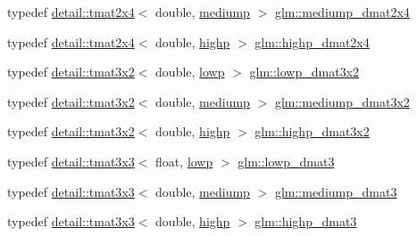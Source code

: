 \begin{DoxyCompactItemize}
typedef \hyperlink{structglm_1_1detail_1_1tmat2x4}{detail\+::tmat2x4}$<$ double, \hyperlink{namespaceglm_a0f04f086094c747d227af4425893f545a6416f3ea0c9025fb21ed50c4d6620482}{mediump} $>$ \hyperlink{group__core__precision_gadb60bf60ef2b8da4a28a372b2bcca3a3}{glm\+::mediump\+\_\+dmat2x4}
\item 
typedef \hyperlink{structglm_1_1detail_1_1tmat2x4}{detail\+::tmat2x4}$<$ double, \hyperlink{namespaceglm_a0f04f086094c747d227af4425893f545ac6f7eab42eacbb10d59a58e95e362074}{highp} $>$ \hyperlink{group__core__precision_gacd51d8188f7d66a83c035b8c4cd69f2d}{glm\+::highp\+\_\+dmat2x4}
\item 
typedef \hyperlink{structglm_1_1detail_1_1tmat3x2}{detail\+::tmat3x2}$<$ double, \hyperlink{namespaceglm_a0f04f086094c747d227af4425893f545ae161af3fc695e696ce3bf69f7332bc2d}{lowp} $>$ \hyperlink{group__core__precision_ga678c21e4fadeda255cfb146d40844bdd}{glm\+::lowp\+\_\+dmat3x2}
\item 
typedef \hyperlink{structglm_1_1detail_1_1tmat3x2}{detail\+::tmat3x2}$<$ double, \hyperlink{namespaceglm_a0f04f086094c747d227af4425893f545a6416f3ea0c9025fb21ed50c4d6620482}{mediump} $>$ \hyperlink{group__core__precision_gaff0060984716bcda68ff69ed27536bf6}{glm\+::mediump\+\_\+dmat3x2}
\item 
typedef \hyperlink{structglm_1_1detail_1_1tmat3x2}{detail\+::tmat3x2}$<$ double, \hyperlink{namespaceglm_a0f04f086094c747d227af4425893f545ac6f7eab42eacbb10d59a58e95e362074}{highp} $>$ \hyperlink{group__core__precision_gac956fe6b946f0ccee78367ccd5427351}{glm\+::highp\+\_\+dmat3x2}
\item 
typedef \hyperlink{structglm_1_1detail_1_1tmat3x3}{detail\+::tmat3x3}$<$ float, \hyperlink{namespaceglm_a0f04f086094c747d227af4425893f545ae161af3fc695e696ce3bf69f7332bc2d}{lowp} $>$ \hyperlink{group__core__precision_ga07d9423bdde2d7ff880d6ece01dc9e32}{glm\+::lowp\+\_\+dmat3}
\item 
typedef \hyperlink{structglm_1_1detail_1_1tmat3x3}{detail\+::tmat3x3}$<$ double, \hyperlink{namespaceglm_a0f04f086094c747d227af4425893f545a6416f3ea0c9025fb21ed50c4d6620482}{mediump} $>$ \hyperlink{group__core__precision_ga80600af2c1ca11ead6123777185c372d}{glm\+::mediump\+\_\+dmat3}
\item 
typedef \hyperlink{structglm_1_1detail_1_1tmat3x3}{detail\+::tmat3x3}$<$ double, \hyperlink{namespaceglm_a0f04f086094c747d227af4425893f545ac6f7eab42eacbb10d59a58e95e362074}{highp} $>$ \hyperlink{group__core__precision_ga993461e1d2caf19abd4f64d02ccdafa9}{glm\+::highp\+\_\+dmat3}
\item 

\end{DoxyCompactItemize}

